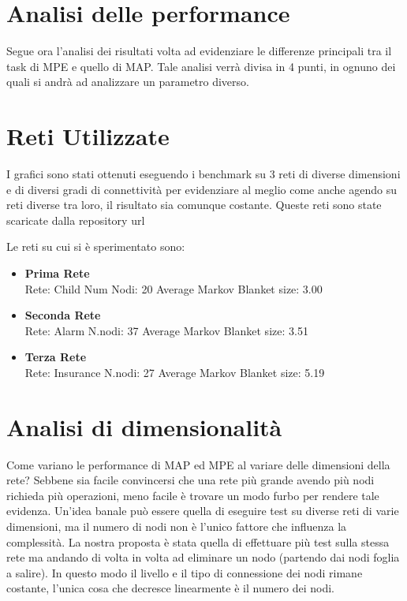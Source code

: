 \section{Analisi delle performance}

Segue ora l’analisi dei risultati volta ad evidenziare le differenze principali tra il task di MPE e quello di MAP. Tale analisi verrà divisa in 4 punti, in ognuno dei quali si andrà ad analizzare un parametro diverso. 

\section{Reti Utilizzate}
I grafici sono stati ottenuti eseguendo i benchmark su 3 reti di diverse dimensioni e di diversi gradi di connettività per evidenziare al meglio come anche agendo su reti diverse tra loro, il risultato sia comunque costante. Queste reti sono state scaricate dalla repository url

Le reti su cui si è sperimentato sono:

\begin{itemize}
\item \textbf{Prima Rete}\\ 
Rete: Child
Num Nodi: 20
Average Markov Blanket size: 3.00

\item \textbf{Seconda Rete}\\ 
Rete: Alarm
N.nodi: 37
Average Markov Blanket size: 3.51

\item \textbf{Terza Rete}\\ 
Rete: Insurance
N.nodi: 27
Average Markov Blanket size: 5.19
\end{itemize}

\section{Analisi di dimensionalità}
Come variano le performance di MAP ed MPE al variare delle dimensioni della rete? Sebbene sia facile convincersi che una rete più grande avendo più nodi richieda più operazioni, meno facile è trovare un modo furbo per rendere tale evidenza.  Un’idea banale può essere quella di eseguire test su diverse reti di varie dimensioni, ma il numero di nodi non è l’unico fattore che influenza la complessità. La nostra proposta è stata quella di effettuare più test sulla stessa rete ma andando di volta in volta ad eliminare un nodo (partendo dai nodi foglia a salire). In questo modo il livello e il tipo di connessione dei nodi rimane costante, l’unica cosa che decresce linearmente è il numero dei nodi.

